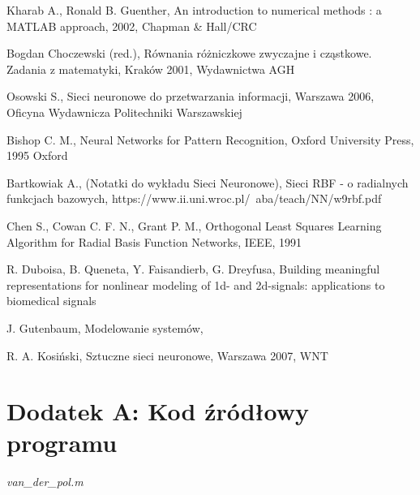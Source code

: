 \clearpage

\begin{thebibliography}{widest-label}

Kharab A., Ronald B. Guenther, An introduction to numerical methods : a MATLAB approach, 2002, Chapman \& Hall/CRC

Bogdan Choczewski (red.), Równania różniczkowe zwyczajne i cząstkowe. Zadania z matematyki, Kraków 2001, Wydawnictwa AGH

Osowski S., Sieci neuronowe do przetwarzania informacji, Warszawa 2006, Oficyna Wydawnicza Politechniki Warszawskiej

Bishop C. M., Neural Networks for Pattern Recognition, Oxford University Press, 1995 Oxford

 Bartkowiak A., (Notatki do wykładu Sieci Neuronowe), Sieci RBF - o radialnych funkcjach bazowych, https://www.ii.uni.wroc.pl/~aba/teach/NN/w9rbf.pdf

 Chen S., Cowan C. F. N., Grant P. M., Orthogonal Least Squares Learning Algorithm for Radial Basis Function Networks, IEEE, 1991

 R. Duboisa, B. Queneta, Y. Faisandierb, G. Dreyfusa, Building meaningful representations for nonlinear modeling of 1d- and 2d-signals: applications to biomedical signals

 J. Gutenbaum, Modelowanie systemów,

 R. A. Kosiński, Sztuczne sieci neuronowe, Warszawa 2007, WNT
\end{thebibliography}

\clearpage
{}
\section*{Dodatek A: Kod źródłowy programu}

\textit{van\_der\_pol.m}

